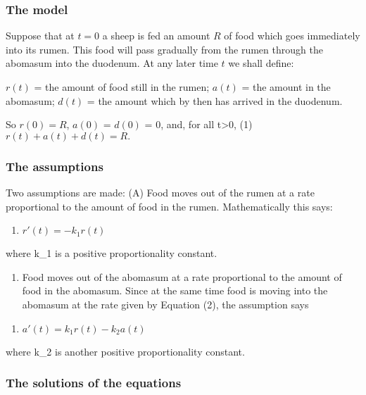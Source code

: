 \documentclass[]{article}
\providecommand{\tightlist}{%
  \setlength{\itemsep}{0pt}\setlength{\parskip}{0pt}}
\begin{document}
\subsubsection{The model}\label{the-model}

Suppose that at \(t = 0\) a sheep is fed an amount \(R\) of food which
goes immediately into its rumen. This food will pass gradually from the
rumen through the abomasum into the duodenum. At any later time \(t\) we
shall define:

\(r(t)\) = the amount of food still in the rumen; \(a(t)\) = the amount
in the abomasum; \(d(t)\) = the amount which by then has arrived in the
duodenum.

So \(r(0) = R\), \(a(0)\) = \(d(0)\) = 0, and, for all t\textgreater{}0,
(1) \(r(t) + a(t) + d(t) = R.\)

\subsubsection{The assumptions}\label{the-assumptions}

Two assumptions are made: (A) Food moves out of the rumen at a rate
proportional to the amount of food in the rumen. Mathematically this
says:

\begin{enumerate}
\def\labelenumi{(\arabic{enumi})}
\setcounter{enumi}{1}
\tightlist
\item
  \(r'(t) = -k_1r(t)\)
\end{enumerate}

where k\_1 is a positive proportionality constant.

\begin{enumerate}
\def\labelenumi{(\Alph{enumi})}
\setcounter{enumi}{1}
\tightlist
\item
  Food moves out of the abomasum at a rate proportional to the amount of
  food in the abomasum. Since at the same time food is moving into the
  abomasum at the rate given by Equation (2), the assumption says
\end{enumerate}

\begin{enumerate}
\def\labelenumi{(\arabic{enumi})}
\setcounter{enumi}{2}
\tightlist
\item
  \(a'(t) = k_1r(t)-k_2a(t)\)
\end{enumerate}

where k\_2 is another positive proportionality constant.

\subsubsection{The solutions of the
equations}\label{the-solutions-of-the-equations}
\end{document}

